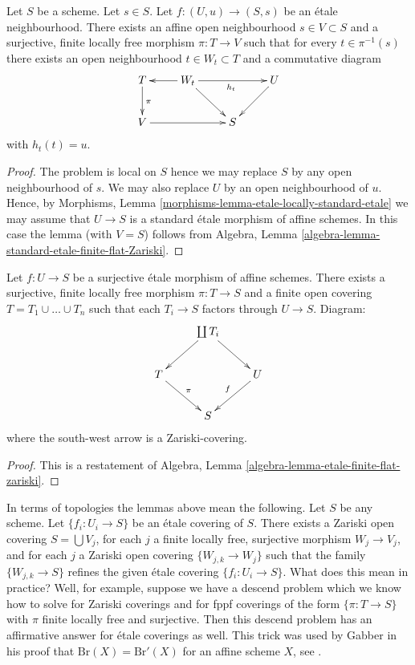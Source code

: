 \begin{lemma}
\label{lemma-dominate-etale-neighbourhood-finite-flat}
Let $S$ be a scheme. Let $s \in S$.
Let $f : (U, u) \to (S, s)$ be an \'etale neighbourhood.
There exists an affine open neighbourhood $s \in V \subset S$
and a surjective, finite locally free morphism $\pi : T \to V$
such that for every $t \in \pi^{-1}(s)$ there exists an
open neighbourhood $t \in W_t \subset T$ and a commutative
diagram
$$
\xymatrix{
T \ar[d]^\pi & W_t \ar[l] \ar[rr]_{h_t} \ar[rd] & & U \ar[dl] \\
V \ar[rr] & & S
}
$$
with $h_t(t) = u$.
\end{lemma}

\begin{proof}
The problem is local on $S$ hence we may replace $S$ by any
open neighbourhood of $s$.
We may also replace $U$ by an open neighbourhood of $u$.
Hence, by Morphisms, Lemma \ref{morphisms-lemma-etale-locally-standard-etale}
we may assume that
$U \to S$ is a standard \'etale morphism of affine schemes.
In this case the lemma (with $V = S$) follows from
Algebra, Lemma \ref{algebra-lemma-standard-etale-finite-flat-Zariski}.
\end{proof}

\begin{lemma}
\label{lemma-dominate-etale-affine-finite-flat}
Let $f : U \to S$ be a surjective \'etale morphism of affine schemes.
There exists a surjective, finite locally free morphism
$\pi : T \to S$ and a finite open covering
$T = T_1 \cup \ldots \cup T_n$ such that each
$T_i \to S$ factors through $U \to S$. Diagram:
$$
\xymatrix{
& \coprod T_i  \ar[rd] \ar[ld] & \\
T \ar[rd]^\pi & & U \ar[ld]_f \\
& S &
}
$$
where the south-west arrow is a Zariski-covering.
\end{lemma}

\begin{proof}
This is a restatement of
Algebra, Lemma \ref{algebra-lemma-etale-finite-flat-zariski}.
\end{proof}

\begin{remark}
\label{remark-topologies}
In terms of topologies the lemmas above mean the following.
Let $S$ be any scheme. Let $\{f_i : U_i \to S\}$ be an \'etale covering
of $S$. There exists a Zariski open covering $S = \bigcup V_j$,
for each $j$ a finite locally free, surjective morphism
$W_j \to V_j$, and for each $j$ a Zariski open covering
$\{W_{j, k} \to W_j\}$ such that the family
$\{W_{j, k} \to S\}$ refines the given \'etale covering
$\{f_i : U_i \to S\}$. What does this mean in practice?
Well, for example, suppose we have a descend problem which we
know how to solve for Zariski coverings and for fppf coverings
of the form $\{\pi : T \to S\}$ with $\pi$ finite locally free
and surjective. Then this descend problem has an affirmative
answer for \'etale coverings as well. This trick was used by
Gabber in his proof that $\text{Br}(X) = \text{Br}'(X)$
for an affine scheme $X$, see \cite{Hoobler}.
\end{remark}




